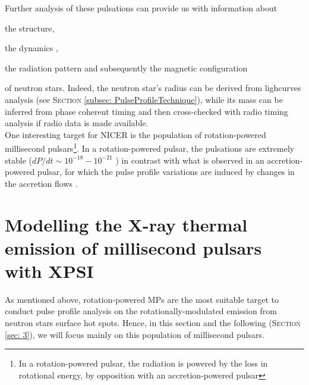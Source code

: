 \documentclass[a4paper, twoside, 12pt]{article}
\numberwithin{equation}{section}
\begin{document}
{%


Further analysis of these pulsations can provide us with information about 
\begin{enumerate*}[label=\roman*)]
\item the structure, 
\item the dynamics \cite{dynamics_NS}, 
\item the radiation pattern and subsequently the magnetic configuration 
\end{enumerate*}
of neutron stars. Indeed, the neutron star's radius can be derived from lighcurves analysis (see S\textsc{ection} \ref{subsec: PulseProfileTechnique}), while its mass can be inferred from phase coherent timing and then cross-checked with radio timing analysis if radio data is made available. \\


One interesting target for NICER is the population of rotation-powered millisecond pulsars\footnote{ In a rotation-powered pulsar, the radiation is powered by the loss in rotational energy, by opposition with an accretion-powered pulsar}. In a rotation-powered pulsar, the pulsations are extremely stable ($dP/dt \sim 10^{-18}-10^{-21}$ \cite{becker_RotationPoweredNS}) in contrast with what is observed in an accretion-powered pulsar, for which the pulse profile variations are induced by changes in the accretion flows \cite{Watts_PulseProfileModelling}.  





\newpage
\section[Modelling the X-ray emission from MPS{\tiny{s}} surface hot spots]{Modelling the X-ray thermal emission of millisecond pulsars with XPSI}
\label{sec: 2}
\hspace{\parindent}	As mentioned above, rotation-powered MPs are the most suitable target to conduct pulse profile analysis on the rotationally-modulated emission from neutron stars surface hot spots. Hence, in this section and the following (S\textsc{ection} \ref{sec: 3}), we will focus mainly on this population of millisecond pulsars.\\

}
\end{document}

